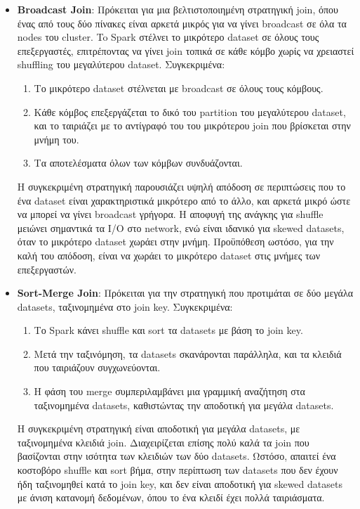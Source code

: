 \documentclass{article}
\begin{document}
\begin{itemize}
    \item \textbf{Broadcast Join}: Πρόκειται για μια βελτιστοποιημένη στρατηγική join, όπου ένας από τους δύο πίνακες είναι αρκετά μικρός για να γίνει broadcast σε όλα τα nodes του cluster. To Spark στέλνει το μικρότερο dataset σε όλους τους επεξεργαστές, επιτρέποντας να γίνει join τοπικά σε κάθε κόμβο χωρίς να χρειαστεί shuffling του μεγαλύτερου dataset. Συγκεκριμένα: 
	\begin{enumerate} 
		\item Το μικρότερο dataset στέλνεται με broadcast σε όλους τους κόμβους.
		\item Κάθε κόμβος επεξεργάζεται το δικό του partition του μεγαλύτερου dataset, και το ταιριάζει με το αντίγραφό του του μικρότερου join που βρίσκεται στην μνήμη του.
		\item Τα αποτελέσματα όλων των κόμβων συνδυάζονται.
	\end{enumerate}
	Η συγκεκριμένη στρατηγική παρουσιάζει υψηλή απόδοση σε περιπτώσεις που το ένα dataset είναι χαρακτηριστικά μικρότερο από το άλλο, και αρκετά μικρό ώστε να μπορεί να γίνει broadcast γρήγορα. Η αποφυγή της ανάγκης για shuffle μειώνει σημαντικά τα I/O στο network, ενώ είναι ιδανικό για skewed datasets, όταν το μικρότερο dataset χωράει στην μνήμη. Προϋπόθεση ωστόσο, για την καλή του απόδοση, είναι να χωράει το μικρότερο dataset στις μνήμες των επεξεργαστών. 
    \item \textbf{Sort-Merge Join}: Πρόκειται για την στρατηγική που προτιμάται σε δύο μεγάλα datasets, ταξινομημένα στο join key. Συγκεκριμένα: 
	\begin{enumerate}
		\item Το Spark κάνει shuffle και sort τα datasets με βάση το join key. 
		\item Μετά την ταξινόμηση, τα datasets σκανάρονται παράλληλα, και τα κλειδιά που ταιριάζουν συγχωνεύονται.
		\item  Η φάση του merge συμπεριλαμβάνει μια γραμμική αναζήτηση στα ταξινομημένα datasets, καθιστώντας την αποδοτική για μεγάλα datasets. 
	\end{enumerate}
	Η συγκεκριμένη στρατηγική είναι αποδοτική για μεγάλα datasets, με ταξινομημένα κλειδιά join. Διαχειρίζεται επίσης πολύ καλά τα join που βασίζονται στην ισότητα των κλειδιών των δύο datasets. Ωστόσο, απαιτεί ένα κοστοβόρο shuffle και sort βήμα, στην περίπτωση των datasets που δεν έχουν ήδη ταξινομηθεί κατά το join key, και δεν είναι αποδοτική για skewed datasets με άνιση κατανομή δεδομένων, όπου το ένα κλειδί έχει πολλά ταιριάσματα. 

\end{itemize}
\end{document}
